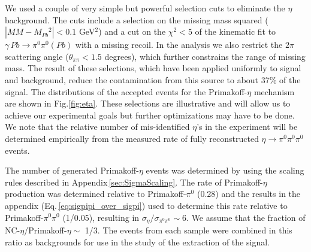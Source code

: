 We used a couple of very simple but powerful selection cuts to
eliminate the $\eta$ background. The cuts include a selection on the
missing mass squared ($|MM - M_{Pb}{^2}| < 0.1$ GeV$^2$) and a cut on
the $\chi^2 < 5$ of the kinematic fit to $\gamma\,Pb\rightarrow
\pi^0\pi^0 (Pb)$ with a missing recoil. In the analysis we also
restrict the $2\pi$ scattering angle ($\theta_{\pi\pi} <1.5$ degrees),
which further constrains the range of missing mass. The result of
these selections, which have been applied uniformly to signal and
background, reduce the contamination from this source to about 37\% of
the signal. The distributions of the accepted events for the
Primakoff-$\eta$ mechanism are shown in Fig.\ref{fig:eta}.  These
selections are illustrative and will allow us to achieve our
experimental goals but further optimizations may have to be done. We note that
the relative number of mis-identified $\eta$'s in the experiment will
be determined empirically from the measured rate of fully
reconstructed $\eta\rightarrow\pi^0\pi^0\pi^0$ events.

The number of generated Primakoff-$\eta$ events was determined by
using the scaling rules described in
Appendix\,\ref{sec:SigmaScaling}. The rate of Primakoff-$\eta$
production was determined relative to Primakoff-$\pi^0$ (0.28) and the
results in the appendix (Eq.\,\ref{eq:sigpipi_over_sigpi}) used to
determine this rate relative to Primakoff-$\pi^0\pi^0$ (1/0.05),
resulting in $\sigma_\eta/\sigma_{\pi^0\pi^0} \sim 6$. We assume that
the fraction of NC-$\eta$/Primakoff-$\eta \sim$ 1/3. The events from
each sample were combined in this ratio as backgrounds for use in the
study of the extraction of the signal.

